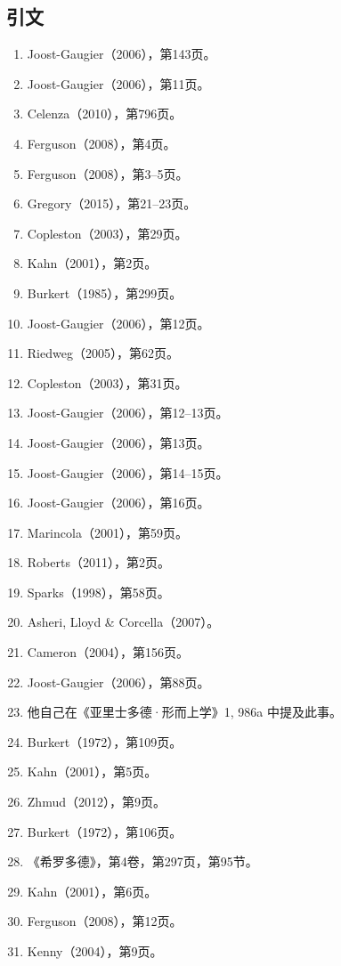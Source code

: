 \subsection{引文}
\begin{enumerate}
\item Joost-Gaugier（2006），第143页。  
\item Joost-Gaugier（2006），第11页。  
\item Celenza（2010），第796页。  
\item Ferguson（2008），第4页。  
\item Ferguson（2008），第3–5页。  
\item Gregory（2015），第21–23页。  
\item Copleston（2003），第29页。  
\item Kahn（2001），第2页。  
\item Burkert（1985），第299页。  
\item Joost-Gaugier（2006），第12页。  
\item Riedweg（2005），第62页。  
\item Copleston（2003），第31页。  
\item Joost-Gaugier（2006），第12–13页。  
\item Joost-Gaugier（2006），第13页。  
\item Joost-Gaugier（2006），第14–15页。  
\item Joost-Gaugier（2006），第16页。  
\item Marincola（2001），第59页。  
\item Roberts（2011），第2页。  
\item Sparks（1998），第58页。  
\item Asheri, Lloyd & Corcella（2007）。  
\item Cameron（2004），第156页。  
\item Joost-Gaugier（2006），第88页。  
\item 他自己在《亚里士多德·形而上学》1, 986a 中提及此事。  
\item Burkert（1972），第109页。  
\item Kahn（2001），第5页。  
\item Zhmud（2012），第9页。  
\item Burkert（1972），第106页。  
\item 《希罗多德》，第4卷，第297页，第95节。  
\item Kahn（2001），第6页。  
\item Ferguson（2008），第12页。  
\item Kenny（2004），第9页。  

\end{enumerate}
